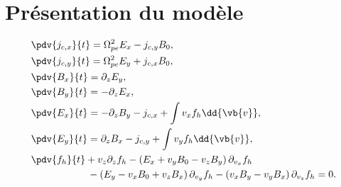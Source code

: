
\section{Présentation du modèle}

\begin{align}
  \label{eq:VHM:jx}
  &\pdv{j_{c,x}}{t} = \Omega_{pe}^2 { E}_x - { j}_{c,y}B_0,\\
  \label{eq:VHM:jy}
  &\pdv{j_{c,y}}{t} = \Omega_{pe}^2 { E}_y + { j}_{c,x}B_0,\\
  \label{eq:VHM:Bx}
  &\pdv{B_{x  }}{t} = \partial_z E_y,\\
  \label{eq:VHM:By}
  &\pdv{B_{y  }}{t} = -\partial_z E_x,\\
  \label{eq:VHM:Ex}
  &\pdv{E_{x  }}{t} =-\partial_z B_y - {j}_{c,x} + \int v_x f_h \dd{\vb{v}},\\
  \label{eq:VHM:Ey}
  &\pdv{E_{y  }}{t} =\partial_z B_x - {j}_{c,y} + \int v_y f_h \dd{\vb{v}}, \\
  \label{eq:VHM:fh}
  &\pdv{f_{h  }}{t} +  v_z\partial_z f_h - \left(E_x + v_y B_0 - v_zB_y\right)\partial_{v_x} f_h\\
  &\hspace{2cm}- \left(E_y - v_x B_0 + v_z B_x\right)\partial_{v_y} f_h- \left(v_x B_y- v_y B_x\right)\partial_{v_z} f_h = 0.\nonumber
\end{align}
